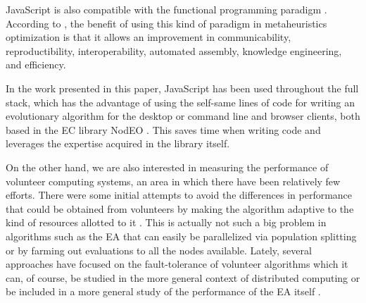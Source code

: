 \documentclass[journal,onecolumn]{IEEEtran}
\begin{document}
JavaScript is also compatible with the functional programming paradigm \cite{Cousineau1998,MacLennan1990,Thompson1996}.
According to \cite{swanresearch2015}, the benefit of using this kind of paradigm in
metaheuristics optimization is that it allows an improvement in communicability,
reproductibility, interoperability, automated assembly, knowledge engineering,
and efficiency.

In the work presented in this paper, JavaScript has been used throughout the full
stack, which has the advantage of using the self-same lines of code for
writing an evolutionary algorithm for the
desktop or command line and browser clients, both based in the EC
library {\sf NodEO} \cite{DBLP:conf/gecco/GuervosVGES14}. This saves time 
when writing code and leverages 
the expertise acquired
 in the library itself. 

On the other hand, we are also interested in measuring the performance
of volunteer computing systems, an area in which there have been
relatively few efforts.
There were some initial attempts to avoid the differences in performance
that could be obtained from volunteers  by making
the algorithm adaptive to the kind of resources allotted to it
\cite{milani2004online}. This is actually not such a big problem in
algorithms such as the EA that can easily be
parallelized via population splitting or by farming out evaluations to all
the nodes available. Lately, several approaches have focused on the
fault-tolerance of volunteer algorithms
\cite{gonzalez2010characterizing} which it can, of course, be studied in
the more general context of distributed computing 
\cite{nogueras2015studying} or be included in a more general study of the
performance of the EA itself
\cite{DBLP:journals/gpem/LaredoBGVAGF14}.
\end{document}

